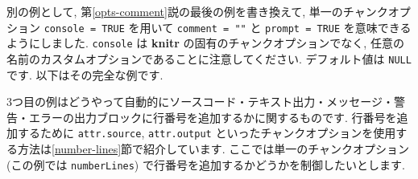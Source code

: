 \documentclass[
  11pt,
  lualatex,ja=standard,jafont=noto]{bxjsreport}
\newenvironment{Shaded}{\begin{snugshade}}{\end{snugshade}}
\newcommand{\InformationTok}[1]{\textcolor[rgb]{0.56,0.35,0.01}{\textbf{\textit{#1}}}}
\newcommand{\NormalTok}[1]{#1}
\begin{document}
別の例として, 第\ref{opts-comment}説の最後の例を書き換えて, 単一のチャンクオプション \texttt{console = TRUE} を用いて \texttt{comment = ""} と \texttt{prompt = TRUE} を意味できるようにしました. \texttt{console} は \textbf{knitr} の固有のチャンクオプションでなく, 任意の名前のカスタムオプションであることに注意してください. デフォルト値は \texttt{NULL} です. 以下はその完全な例です.

\begin{Shaded}
\end{Shaded}

3つ目の例はどうやって自動的にソースコード・テキスト出力・メッセージ・警告・エラーの出力ブロックに行番号を追加するかに関するものです. 行番号を追加するために \texttt{attr.source}, \texttt{attr.output} といったチャンクオプションを使用する方法は\ref{number-lines}節で紹介しています. ここでは単一のチャンクオプション (この例では \texttt{numberLines}) で行番号を追加するかどうかを制御したいとします.
\end{document}
